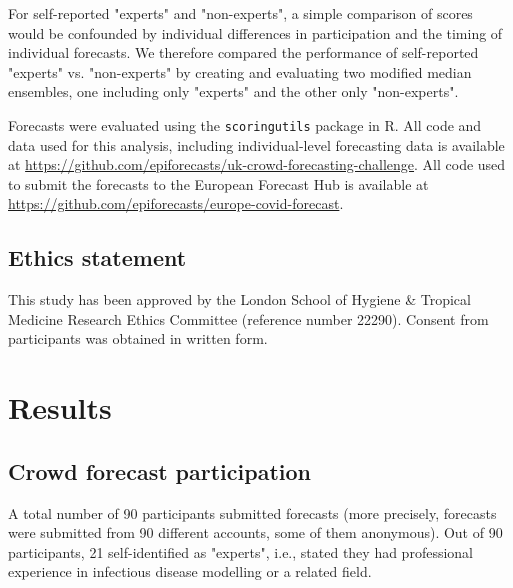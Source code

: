 \documentclass[10pt,a4paper,twocolumn]{article}
\begin{document}
For self-reported "experts" and "non-experts", a simple comparison of scores would be confounded by individual differences in participation and the timing of individual forecasts. We therefore compared the performance of self-reported "experts" vs. "non-experts" by creating and evaluating two modified median ensembles, one including only "experts" and the other only "non-experts".


Forecasts were evaluated using the \texttt{scoringutils} \citep{bosseEvaluatingForecastsScoringutils2022} package in \textsf{R}. All code and data used for this analysis, including individual-level forecasting data is available at \url{https://github.com/epiforecasts/uk-crowd-forecasting-challenge}. All code used to submit the forecasts to the European Forecast Hub is available at \url{https://github.com/epiforecasts/europe-covid-forecast}. 

\subsection*{Ethics statement}
This study has been approved by the London School of Hygiene \& Tropical Medicine Research Ethics Committee (reference number 22290). Consent from participants was obtained in written form.



\section*{Results}

\subsection*{Crowd forecast participation}

A total number of 90 participants submitted forecasts (more precisely, forecasts were submitted from 90 different accounts, some of them anonymous). Out of 90 participants, 21 self-identified as "experts", i.e., stated they had professional experience in infectious disease modelling or a related field. 
\end{document}
